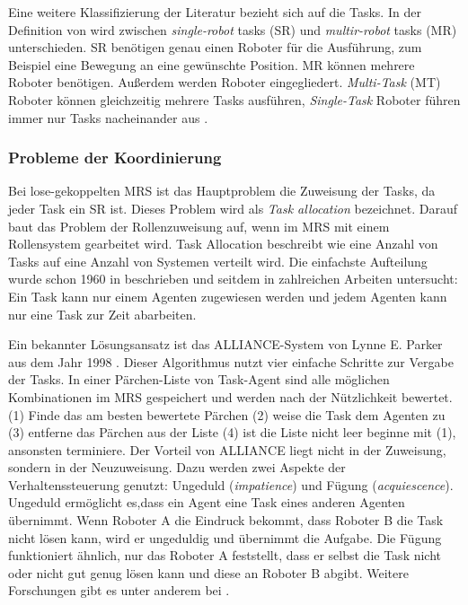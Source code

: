 Eine weitere Klassifizierung der Literatur bezieht sich auf die Tasks. In der Definition von \cite{gerkey2004formal} wird zwischen \textit{single-robot} tasks (SR) und \textit{multir-robot} tasks (MR) unterschieden. SR benötigen genau einen Roboter für die Ausführung, zum Beispiel eine Bewegung an eine gewünschte Position. MR können mehrere Roboter benötigen. Außerdem werden Roboter eingegliedert.\textit{ Multi-Task} (MT) Roboter können gleichzeitig mehrere Tasks ausführen, \textit{Single-Task} Roboter führen immer nur Tasks nacheinander aus \citep{lundh2006plan}. 

\subsubsection{Probleme der Koordinierung}
\label{sec:prob-koor}
Bei lose-gekoppelten MRS ist das Hauptproblem die Zuweisung der Tasks, da jeder Task ein SR ist. Dieses Problem wird als \textit{Task allocation} bezeichnet. Darauf baut das Problem der Rollenzuweisung auf, wenn im MRS mit einem Rollensystem gearbeitet wird. Task Allocation beschreibt wie eine Anzahl von Tasks auf eine Anzahl von Systemen verteilt wird. Die einfachste Aufteilung wurde schon 1960 in \cite{gale1989theory} beschrieben und seitdem in zahlreichen Arbeiten untersucht: Ein Task kann nur einem Agenten zugewiesen werden und jedem Agenten kann nur eine Task zur Zeit abarbeiten.

Ein bekannter Lösungsansatz ist das ALLIANCE-System von Lynne E. Parker aus dem Jahr 1998 \cite{parker1998alliance}. Dieser Algorithmus nutzt vier einfache Schritte zur Vergabe der Tasks. In einer Pärchen-Liste von Task-Agent sind alle möglichen Kombinationen im MRS gespeichert und werden nach der Nützlichkeit bewertet. (1) Finde das am besten bewertete Pärchen (2) weise die Task dem Agenten zu (3) entferne das Pärchen aus der Liste (4) ist die Liste nicht leer beginne mit (1), ansonsten terminiere. Der Vorteil von ALLIANCE liegt nicht in der Zuweisung, sondern in der Neuzuweisung. Dazu werden zwei Aspekte der Verhaltenssteuerung genutzt: Ungeduld (\textit{impatience}) und Fügung (\textit{acquiescence}). Ungeduld ermöglicht es,dass ein Agent eine Task eines anderen Agenten übernimmt. Wenn Roboter A die Eindruck bekommt, dass Roboter B die Task nicht lösen kann, wird er ungeduldig und übernimmt die Aufgabe. Die Fügung funktioniert ähnlich, nur das Roboter A feststellt, dass er selbst die Task nicht oder nicht gut genug lösen kann und diese an Roboter B abgibt. Weitere Forschungen gibt es unter anderem bei \cite{werger2000broadcast}.

